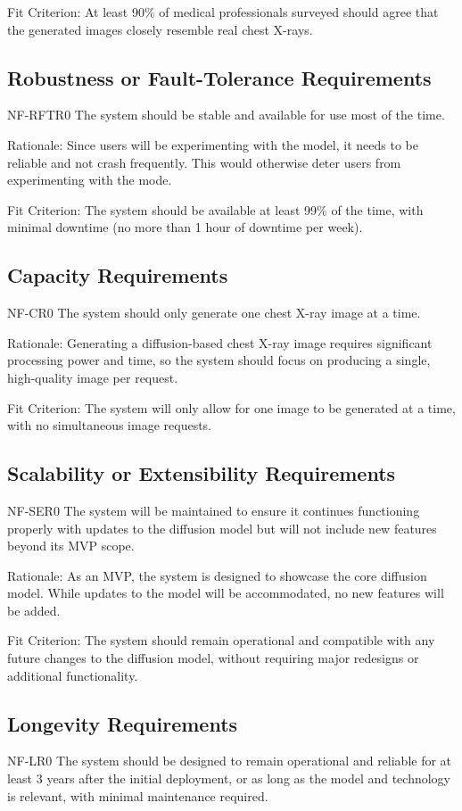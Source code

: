 \documentclass[12pt]{article}
\begin{document}
Fit Criterion: At least 90\% of medical professionals surveyed should agree that the generated 
images closely resemble real chest X-rays.

\subsection{Robustness or Fault-Tolerance Requirements}
NF-RFTR0 The system should be stable and available for use most of the time.

Rationale: Since users will be experimenting with the model, it needs to be reliable and not crash 
frequently. This would otherwise deter users from experimenting with the mode.

Fit Criterion: The system should be available at least 99\% of the time, with minimal downtime (no 
more than 1 hour of downtime per week).


\subsection{Capacity Requirements}
NF-CR0 The system should only generate one chest X-ray image at a time.

Rationale: Generating a diffusion-based chest X-ray image requires significant processing power 
and time, so the system should focus on producing a single, high-quality image per request.

Fit Criterion: The system will only allow for one image to be generated at a time, with no 
simultaneous image requests.

\subsection{Scalability or Extensibility Requirements}
NF-SER0 The system will be maintained to ensure it continues functioning properly with updates to 
the diffusion model but will not include new features beyond its MVP scope.

Rationale: As an MVP, the system is designed to showcase the core diffusion model. While updates
 to the model will be accommodated, no new features will be added.

Fit Criterion: The system should remain operational and compatible with any future changes to the
 diffusion model, without requiring major redesigns or additional functionality.

\subsection{Longevity Requirements}
NF-LR0 The system should be designed to remain operational and reliable for at least 3 years after 
the initial deployment, or as long as the model and technology is relevant, with minimal 
maintenance required.
\end{document}
